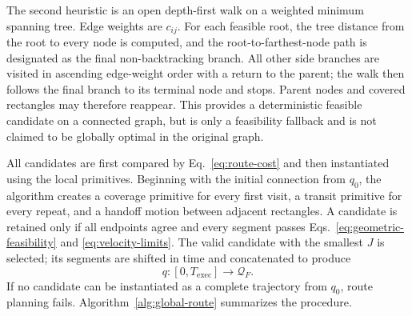 \documentclass[a4paper,11pt]{article}
\begin{document}
The second heuristic is an open depth-first walk on a weighted minimum spanning tree. Edge weights are $c_{ij}$. For each feasible root, the tree distance from the root to every node is computed, and the root-to-farthest-node path is designated as the final non-backtracking branch. All other side branches are visited in ascending edge-weight order with a return to the parent; the walk then follows the final branch to its terminal node and stops. Parent nodes and covered rectangles may therefore reappear. This provides a deterministic feasible candidate on a connected graph, but is only a feasibility fallback and is not claimed to be globally optimal in the original graph.

All candidates are first compared by Eq.~\eqref{eq:route-cost} and then instantiated using the local primitives. Beginning with the initial connection from $q_0$, the algorithm creates a coverage primitive for every first visit, a transit primitive for every repeat, and a handoff motion between adjacent rectangles. A candidate is retained only if all endpoints agree and every segment passes Eqs.~\eqref{eq:geometric-feasibility} and \eqref{eq:velocity-limits}. The valid candidate with the smallest $J$ is selected; its segments are shifted in time and concatenated to produce
\begin{equation}
q:[0,T_{\mathrm{exec}}]\rightarrow\mathcal Q_F.
\tag{22}
\label{eq:complete-trajectory}
\end{equation}
If no candidate can be instantiated as a complete trajectory from $q_0$, route planning fails. Algorithm~\ref{alg:global-route} summarizes the procedure.
\end{document}
